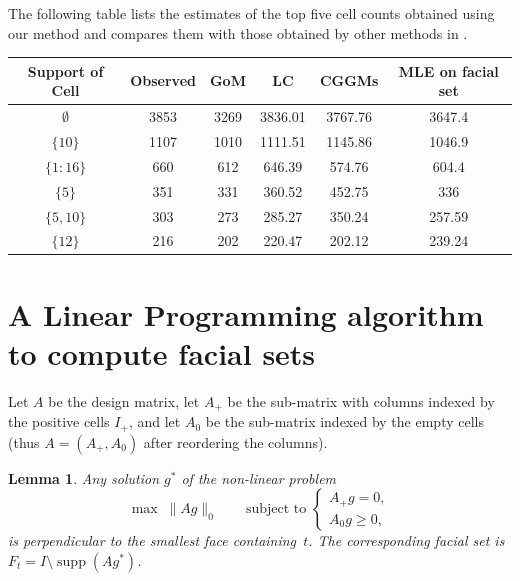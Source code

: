 \documentclass[aos,noinfoline]{imsart}
\DeclareMathOperator{\supp}{supp}
\newtheorem{lemma}[theorem]{Lemma}
\theoremstyle{remark}
\theoremstyle{definition}
\begin{document}
The following table lists the estimates of the top five cell counts obtained using our method and compares them with those obtained by other methods in \citet{DobraLenkoski11:Copula_Gaussian_graphical_models}.
\begin{center}
  \small
  \begin{tabular}{cccccc}
    \toprule
    Support of Cell & Observed & GoM & LC &CGGMs & MLE on facial set \\
    \midrule
    $\emptyset$ & 3853 & 3269 & 3836.01 & 3767.76 & 3647.4 \\
    $\{10\}$ & 1107 & 1010 & 1111.51 & 1145.86 & 1046.9 \\
    $\{1:16\}$ & 660 & 612 & 646.39 & 574.76 &  604.4 \\
    $\{5\}$ &  351 & 331 & 360.52 & 452.75 &  336 \\
    $\{5,10\}$ & 303 & 273 & 285.27 & 350.24 &  257.59 \\
    $\{12\}$ & 216 & 202 & 220.47  & 202.12 &  239.24 \\
    \bottomrule
  \end{tabular}
\end{center}


% 
% 


\section{A Linear Programming algorithm to compute facial sets}
\label{S-linear programming}
 
Let $A$ be the design matrix, let $A_{+}$ be the sub-matrix with columns indexed by the positive cells $I_{+}$, and let $A_{0}$ be the sub-matrix indexed by the empty cells (thus $A=(A_{+},A_{0})$ after reordering the columns).
\begin{lemma}
  Any solution $g^*$ of the non-linear problem
  \begin{equation}
    \label{S-lm:face}
    \max \; \lVert Ag \rVert_0
    \qquad\text{subject to }
    \begin{cases}
      A_{+} g=0, \\ %
      A_0 g \geqslant 0,
    \end{cases}
  \end{equation}
  is perpendicular to the smallest face containing~$t$. The corresponding facial set is  $F_t=I \setminus \supp(Ag^*)$.
\end{lemma}
\end{document}
